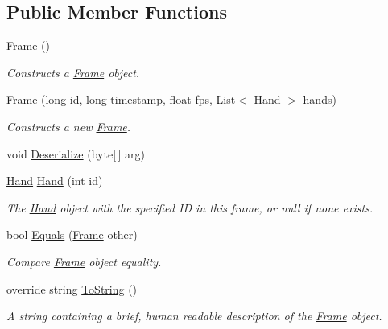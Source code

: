 \subsection*{Public Member Functions}
\begin{DoxyCompactItemize}
\item 
\mbox{\hyperlink{class_leap_1_1_frame_a12db521b197948c89f8330f69333ddcc}{Frame}} ()
\begin{DoxyCompactList}\small\item\em Constructs a \mbox{\hyperlink{class_leap_1_1_frame}{Frame}} object. \end{DoxyCompactList}\item 
\mbox{\hyperlink{class_leap_1_1_frame_a88104b28255726f1afffe2c954553e0d}{Frame}} (long id, long timestamp, float fps, List$<$ \mbox{\hyperlink{class_leap_1_1_hand}{Hand}} $>$ hands)
\begin{DoxyCompactList}\small\item\em Constructs a new \mbox{\hyperlink{class_leap_1_1_frame}{Frame}}. \end{DoxyCompactList}\item 
void \mbox{\hyperlink{class_leap_1_1_frame_ad98511374fd0fbb8edfc33ba6c3bb75e}{Deserialize}} (byte\mbox{[}$\,$\mbox{]} arg)
\item 
\mbox{\hyperlink{class_leap_1_1_hand}{Hand}} \mbox{\hyperlink{class_leap_1_1_frame_a80b74f329128a4c2630d15bf34d9c234}{Hand}} (int id)
\begin{DoxyCompactList}\small\item\em The \mbox{\hyperlink{class_leap_1_1_hand}{Hand}} object with the specified ID in this frame, or null if none exists. \end{DoxyCompactList}\item 
bool \mbox{\hyperlink{class_leap_1_1_frame_a187abb599b41235c216bb8c8729bbc46}{Equals}} (\mbox{\hyperlink{class_leap_1_1_frame}{Frame}} other)
\begin{DoxyCompactList}\small\item\em Compare \mbox{\hyperlink{class_leap_1_1_frame}{Frame}} object equality. \end{DoxyCompactList}\item 
override string \mbox{\hyperlink{class_leap_1_1_frame_a06555bb46574837e237ebe18f0f75fab}{To\+String}} ()
\begin{DoxyCompactList}\small\item\em A string containing a brief, human readable description of the \mbox{\hyperlink{class_leap_1_1_frame}{Frame}} object. \end{DoxyCompactList}\end{DoxyCompactItemize}
